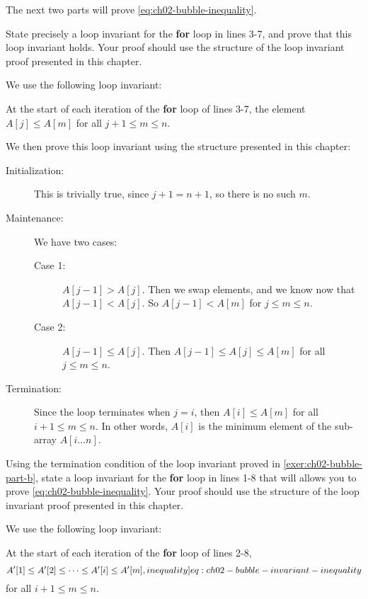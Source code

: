 \documentclass[Chapter02]{subfiles}
\begin{document}
\begin{problems}
		The next two parts will prove \cref{eq:ch02-bubble-inequality}.

		\begin{problems}[resume]
			\item State precisely a loop invariant for the \textbf{for} loop in lines 3-7, and prove that this loop invariant holds. Your proof should use the structure of the loop invariant proof presented in this chapter. \label{exer:ch02-bubble-part-b}
			\begin{answer}
				We use the following loop invariant:
				\begin{addmargin}[2em]{2em}
					At the start of each iteration of the \textbf{for} loop of lines 3-7, the element $A[j] \leq A[m]$ for all $j + 1 \leq m \leq n$.
				\end{addmargin}

				We then prove this loop invariant using the structure presented in this chapter:
				\begin{description}
					\item[Initialization:] This is trivially true, since $j + 1 = n + 1$, so there is no such $m$.

					\item[Maintenance:] We have two cases:
					\begin{description}
						\item[Case 1:] $A[j - 1] > A[j]$. Then we swap elements, and we know now that $A[j - 1] < A[j]$. So $A[j - 1] < A[m]$ for $j \leq m \leq n$.
						\item[Case 2:] $A[j - 1] \leq A[j]$. Then $A[j - 1] \leq A[j] \leq A[m]$ for all $j \leq m \leq n$.
					\end{description}

					\item[Termination:] Since the loop terminates when $j = i$, then $A[i] \leq A[m]$ for all $i + 1 \leq m \leq n$. In other words, $A[i]$ is the minimum element of the sub-array $A[i \dots n]$.
				\end{description}
			\end{answer}
			
			\item Using the termination condition of the loop invariant proved in \cref{exer:ch02-bubble-part-b}, state a loop invariant for the \textbf{for} loop in lines 1-8 that will allows you to prove \cref{eq:ch02-bubble-inequality}. Your proof should use the structure of the loop invariant proof presented in this chapter.
			\begin{answer}
				We use the following loop invariant:
				\begin{addmargin}[2em]{2em}
					At the start of each iteration of the \textbf{for} loop of lines 2-8,
					\begin{equation}
						A'[1] \leq A'[2] \leq \dots \leq A'[i] \leq A'[m], \label[inequality]{eq:ch02-bubble-invariant-inequality}
					\end{equation}
					for all $i + 1 \leq m \leq n$.
				\end{addmargin}


\end{answer}
\end{problems}
\end{problems}
\end{document}
